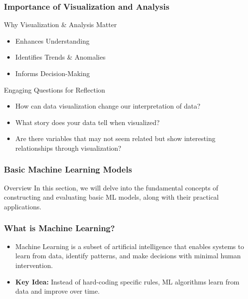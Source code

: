 \documentclass[aspectratio=169]{beamer}
\begin{document}
\begin{frame}[fragile]
    \frametitle{Importance of Visualization and Analysis}
    \begin{block}{Why Visualization & Analysis Matter}
        \begin{itemize}
            \item Enhances Understanding
            \item Identifies Trends \& Anomalies
            \item Informs Decision-Making
        \end{itemize}
    \end{block}
    \begin{block}{Engaging Questions for Reflection}
        \begin{itemize}
            \item How can data visualization change our interpretation of data?
            \item What story does your data tell when visualized?
            \item Are there variables that may not seem related but show interesting relationships through visualization?
        \end{itemize}
    \end{block}
\end{frame}

\begin{frame}[fragile]
    \frametitle{Basic Machine Learning Models}
    \begin{block}{Overview}
        In this section, we will delve into the fundamental concepts of constructing and evaluating basic ML models, along with their practical applications.
    \end{block}
\end{frame}

\begin{frame}[fragile]
    \frametitle{What is Machine Learning?}
    \begin{itemize}
        \item Machine Learning is a subset of artificial intelligence that enables systems to learn from data, identify patterns, and make decisions with minimal human intervention.
        \item \textbf{Key Idea:} Instead of hard-coding specific rules, ML algorithms learn from data and improve over time.
    \end{itemize}
\end{frame}
\end{document}
